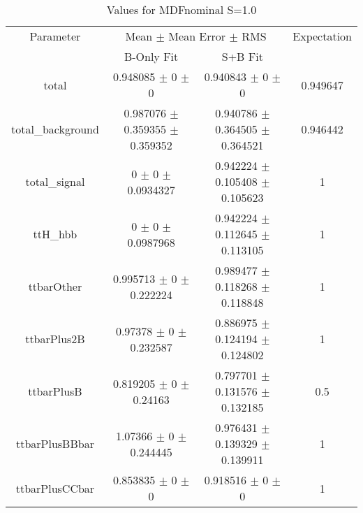 \begin{table}
\centering
\caption{Values for MDFnominal S=1.0}
\begin{tabular}{cccc}
\toprule
Parameter & \multicolumn{2}{c}{Mean $\pm$ Mean Error $\pm$ RMS} & Expectation\\
 & B-Only Fit & S+B Fit & \\
\midrule
total & \num{0.948085} $\pm$ \num{0} $\pm$ \num{0} & \num{0.940843} $\pm$ \num{0} $\pm$ \num{0} & \num{0.949647}\\
total\_background & \num{0.987076} $\pm$ \num{0.359355} $\pm$ \num{0.359352} & \num{0.940786} $\pm$ \num{0.364505} $\pm$ \num{0.364521} & \num{0.946442}\\
total\_signal & \num{0} $\pm$ \num{0} $\pm$ \num{0.0934327} & \num{0.942224} $\pm$ \num{0.105408} $\pm$ \num{0.105623} & \num{1}\\
ttH\_hbb & \num{0} $\pm$ \num{0} $\pm$ \num{0.0987968} & \num{0.942224} $\pm$ \num{0.112645} $\pm$ \num{0.113105} & \num{1}\\
ttbarOther & \num{0.995713} $\pm$ \num{0} $\pm$ \num{0.222224} & \num{0.989477} $\pm$ \num{0.118268} $\pm$ \num{0.118848} & \num{1}\\
ttbarPlus2B & \num{0.97378} $\pm$ \num{0} $\pm$ \num{0.232587} & \num{0.886975} $\pm$ \num{0.124194} $\pm$ \num{0.124802} & \num{1}\\
ttbarPlusB & \num{0.819205} $\pm$ \num{0} $\pm$ \num{0.24163} & \num{0.797701} $\pm$ \num{0.131576} $\pm$ \num{0.132185} & \num{0.5}\\
ttbarPlusBBbar & \num{1.07366} $\pm$ \num{0} $\pm$ \num{0.244445} & \num{0.976431} $\pm$ \num{0.139329} $\pm$ \num{0.139911} & \num{1}\\
ttbarPlusCCbar & \num{0.853835} $\pm$ \num{0} $\pm$ \num{0} & \num{0.918516} $\pm$ \num{0} $\pm$ \num{0} & \num{1}\\
\bottomrule
\end{tabular}
\end{table}